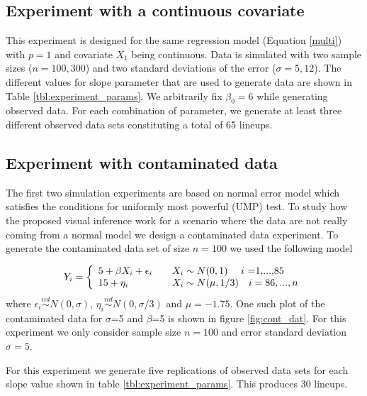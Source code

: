 \documentclass{article}
\begin{document}
\subsection{Experiment with a continuous covariate} 

This experiment is designed for the same regression model (Equation \eqref{multi}) with $p=1$ and covariate $X_1$ being continuous. Data is simulated with two sample sizes ($n=100, 300$) and two standard deviations of the error ($\sigma=5, 12$). The different values for slope parameter that are used to generate data are shown in Table \ref{tbl:experiment_params}. We arbitrarily fix $\beta_0 = 6$ while generating observed data. For each combination of parameter, we generate at least three different observed data sets constituting a total of 65 lineups. 


\subsection{Experiment with contaminated data}

The first two simulation experiments are based on normal error model which satisfies the conditions for uniformly most powerful (UMP) test. To study how the proposed visual inference work for a scenario where the data are not really coming from a normal model we design a contaminated data experiment. To generate the contaminated data set of size $n=100$ we used the following model


\[
  Y_i = \left\{
  \begin{array}{l l}
    5+\beta X_i + \epsilon_i  & \quad  X_i \sim N(0,1) \quad \text{ $i$ =1,...,85}\\
    15+ \eta_i & \quad X_i \sim N(\mu,1/3) \quad  i=86,...,n\\
  \end{array} \right.
\]
where $\epsilon_i \stackrel{iid}\sim N(0,\sigma)$, $\eta_i \stackrel{iid}\sim N(0,\sigma/3)$ and $\mu = -1.75$. One such plot of the contaminated data for $\sigma$=5 and $\beta$=5 is shown in figure \ref{fig:cont_dat}. For this experiment we only consider sample size $n=100$ and error standard deviation $\sigma=5$.

For this experiment we generate five replications of observed data sets for each slope value shown in table \ref{tbl:experiment_params}. This produces 30 lineups.
\end{document}
